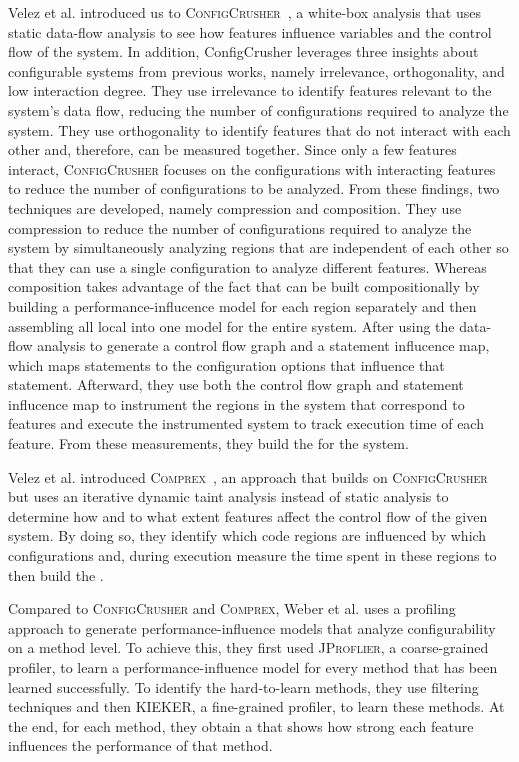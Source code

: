 Velez et al. introduced us to \textsc{ConfigCrusher}~\cite{ConfigCrusher}, 
a white-box analysis that uses static data-flow analysis to see how features influence variables and the control flow of the system. 
In addition, ConfigCrusher leverages three insights about configurable systems from previous works, namely irrelevance, orthogonality, 
and low interaction degree. They use irrelevance to identify features relevant to the system's data flow, 
reducing the number of configurations required to analyze the system. They use orthogonality to identify features that do not interact with each other and, 
therefore, can be measured together. Since only a few features interact, 
\textsc{ConfigCrusher} focuses on the configurations with interacting features to reduce the number of configurations to be analyzed. 
From these findings, two techniques are developed, namely compression and composition. 
They use compression to reduce the number of configurations required to analyze the system by simultaneously analyzing regions that are independent of each other 
so that they can use a single configuration to analyze different features. 
Whereas composition takes advantage of the fact that {\perfInfluenceModel} can be built compositionally by building a performance-influcence model 
for each region separately and then assembling all local {\perfInfluenceModel} into one model for the entire system.
After using the data-flow analysis to generate a control flow graph and a statement influcence map, which maps statements to the configuration options 
that influence that statement.
Afterward, they use both the control flow graph and statement influcence map to instrument the regions in the system that correspond to features and execute
the instrumented system to track execution time of each feature. From these measurements, they build the {\perfInfluenceModel} for the system.

Velez et al. introduced \textsc{Comprex}~\cite{Comprex}, an approach that builds on \textsc{ConfigCrusher} 
but uses an iterative dynamic taint analysis instead of static analysis to determine how and to what extent features affect the control flow of the given system.
By doing so, they identify which code regions are influenced by which configurations and, during execution measure the time spent in these regions to then build 
the {\perfInfluenceModel}.

Compared to \textsc{ConfigCrusher} and \textsc{Comprex}, Weber et al. 
\cite{White-box-Profiling} uses a profiling approach to generate performance-influence models that analyze configurability on a method level. 
To achieve this, they first used \textsc{JProflier}, a coarse-grained profiler, 
to learn a performance-influence model for every method that has been learned successfully. To identify the hard-to-learn methods, 
they use filtering techniques and then \textsc{KIEKER}, a fine-grained profiler, to learn these methods. At the end, for each method, they
obtain a {\perfInfluenceModel} that shows how strong each feature influences the performance of that method.


